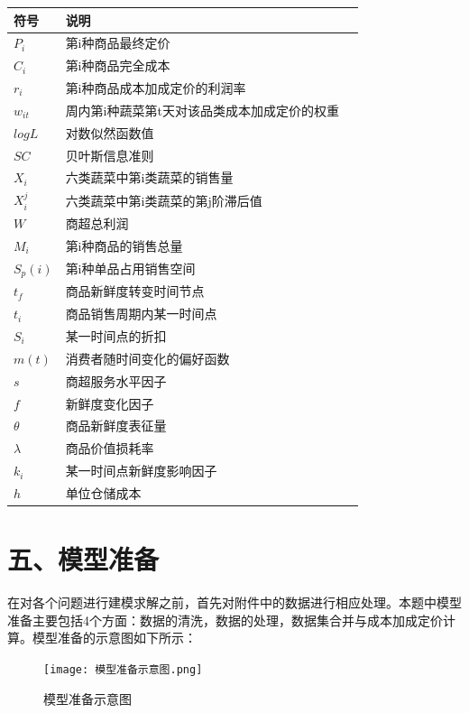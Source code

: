 \documentclass{my_paper}
\begin{document}
\begin{table}[H]
    \centering
    \begin{tabular}{p{2.0cm}<{\centering}p{9.0cm}<{\centering}p{2.0cm}<{\centering}}
    \toprule
    符号 & 说明  \\ 
    \midrule
    $P_i$&     第i种商品最终定价\\
    $C_i$&     第i种商品完全成本\\
    $r_i$&     第i种商品成本加成定价的利润率\\
    $w_{it}$    &周内第i种蔬菜第t天对该品类成本加成定价的权重\\
    $logL$&     对数似然函数值  \\
    $SC$&     贝叶斯信息准则   \\
    $X_i$&   六类蔬菜中第i类蔬菜的销售量 \\
    $X_i^j$& 六类蔬菜中第i类蔬菜的第j阶滞后值 \\
    $W$ & 商超总利润 \\
    $M_i$ & 第i种商品的销售总量 \\
    $S_p(i)$ & 第i种单品占用销售空间 \\
    $t_f$& 商品新鲜度转变时间节点 \\
    $t_i$& 商品销售周期内某一时间点 \\
    $S_i$& 某一时间点的折扣\\
    $m(t)$& 消费者随时间变化的偏好函数 \\
    $s$& 商超服务水平因子 \\
    $f$& 新鲜度变化因子 \\
    $\theta$& 商品新鲜度表征量 \\
    $\lambda$& 商品价值损耗率 \\
    $k_i$& 某一时间点新鲜度影响因子\\
    $h$& 单位仓储成本\\
    \bottomrule
    \end{tabular}
\end{table}
\section{五、模型准备}
在对各个问题进行建模求解之前，首先对附件中的数据进行相应处理。本题中模型准备主要包括4个方面：数据的清洗，数据的处理，数据集合并与成本加成定价计算。模型准备的示意图如下所示：
\begin{figure}[H]
 \centering
 \texttt{[image: 模型准备示意图.png]} %
 \caption{模型准备示意图} %
 \label{模型准备示意图} %
\end{figure}\par
\end{document}
